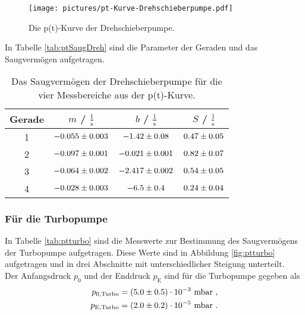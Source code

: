 \begin{figure} %
  \centering
  \texttt{[image: pictures/pt-Kurve-Drehschieberpumpe.pdf]}
  \caption{Die p(t)-Kurve der Drehschieberpumpe.}
  \label{fig:ptdreh}
\end{figure}

In Tabelle \eqref{tab:ptSaugDreh} sind die Parameter der Geraden und das Saugvermögen aufgetragen.

\begin{table}
  \centering
  \caption{Das Saugvermögen der Drehschieberpumpe für die vier Messbereiche aus der p(t)-Kurve.}
  \label{tab:ptSaugDreh}
    \begin{tabular}{c|c|c|c}
      Gerade & $m$ / $\frac{1}{\text{s}}$ & $b$ / $\frac{1}{\text{s}}$ & $S$ / $\frac{\text{l}}{\text{s}}$ \\
      \midrule
      1 & $\num{-0.055 +- 0.003}$ & $\num{-1.42 +- 0.08}$ & $\num{0.47 +- 0.05}$ \\
      2 & $\num{-0.097 +- 0.001}$ & $\num{-0.021 +- 0.001}$ & $\num{0.82 +- 0.07}$ \\
      3 & $\num{-0.064 +- 0.002}$ & $\num{-2.417 +- 0.002}$ & $\num{0.54 +- 0.05}$ \\
      4 & $\num{-0.028 +- 0.003}$ & $\num{-6.5 +- 0.4}$ & $\num{0.24 +- 0.04}$ \\
    \end{tabular}
\end{table}



\subsubsection{Für die Turbopumpe}
In Tabelle \eqref{tab:ptturbo} sind die Messwerte zur Bestimmung des Saugvermögens der Turbopumpe aufgetragen. Diese Werte sind in Abbildung \eqref{fig:ptturbo} aufgetragen und in drei Abschnitte mit unterschiedlicher Steigung unterteilt. \\
Der Anfangsdruck $p_0$ und der Enddruck $p_\text{E}$ sind für die Turbopumpe gegeben als
\begin{align*}
  p_{0,\text{Turbo}} = (\num{5 +- 0.5})\cdot 10^{-3}\ \text{mbar} \ , \\
  p_{\text{E},\text{Turbo}} = (\num{2 +- 0.2})\cdot 10^{-5}\ \text{mbar} \ .
\end{align*}

